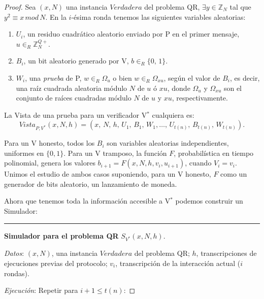 \begin{proof}
	Sea $(x,N)$ una instancia $Verdadera$ del problema QR, $\exists y\in \mathbb{Z}_N$ tal que $y^2\equiv x \, mod \, N$. En la $i$-ésima ronda tenemos las siguientes variables aleatorias:
	
	\begin{enumerate}
		\item $U_i$, un residuo cuadrático aleatorio enviado por P en el primer mensaje, $u \in_R \mathbb{Z}^{Q+}_N$.
		
		\item $B_i$, un bit aleatorio generado por V, $b \in_R \{0,\,1\}$.
		
		\item $W_i$, una \textit{prueba} de P, $w \in_R \Omega_u$ o bien $w \in_R \Omega_{xu}$, según el valor de $B_i$, es decir, una raíz cuadrada aleatoria módulo $N$ de $u$ ó $xu$, donde $\Omega_u$ y $ \Omega_{xu}$ son el conjunto de raíces cuadradas módulo $N$ de $u$ y $xu$, respectivamente.
	\end{enumerate}
	
	
	La Vista de una prueba para un verificador V$^*$ cualquiera es:
	\[Vista_{P,V^*}(x,N,h) = (x,\,N,\,h,\,U_1,\,B_1,\,W_1, \dots ,\,U_{t(n)},\,B_{t(n)},\,W_{t(n)}).\]
	
	
	Para un V honesto, todos los $B_i$ son variables aleatorias independientes, uniformes en $\{0,1\}$. Para un V tramposo, la función $F$, probabilística en tiempo polinomial, genera los valores $b_{i+1} = F(x,N,h,v_i,u_{i+1})$, cuando $V_i = v_i$. Unimos el estudio de ambos casos suponiendo, para un V honesto, $F$ como un generador de bits aleatorio, un lanzamiento de moneda.
	
	Ahora que tenemos toda la información accesible a V$^*$ podemos construir un Simulador:
	
	\hfil 
	
	\rule{\textwidth}{1pt}
	
	\textbf{Simulador para el problema QR} $S_{V^*}(x,N,h)$.
	
	\hfil
	
	\textit{Datos}: \quad $(x,N)$, una instancia $Verdadera$ del problema QR; \quad $h$, transcripciones de ejecuciones previas del protocolo; \quad $v_i$, transcripción de la interacción actual ($i$ rondas).
	
	\textit{Ejecución}: Repetir para $i+1 \leq t(n)$:
	

\end{proof}
